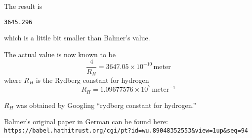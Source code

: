 \documentclass[12pt]{article}
\begin{document}
\medskip
\noindent
The result is
{\footnotesize
\begin{verbatim}
3645.296
\end{verbatim}
}

\noindent
which is a little bit smaller than Balmer's value.

\bigskip
\noindent
The actual value is now known to be
\begin{equation*}
\frac{4}{R_H}=3647.05\times10^{-10}\,\text{meter}
\end{equation*}
where $R_H$ is the Rydberg constant for hydrogen
\begin{equation*}
R_H=1.09677576\times10^7\,\text{meter}^{-1}
\end{equation*}

\noindent
$R_H$ was obtained by Googling ``rydberg constant for hydrogen.''

\bigskip
\noindent
Balmer's original paper in German can be found here:\\
{\small\verb$https://babel.hathitrust.org/cgi/pt?id=wu.89048352553&view=1up&seq=94$}
\end{document}
